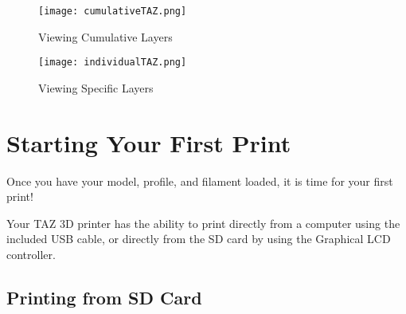 \begin{figure}[H]
\centering
\texttt{[image: cumulativeTAZ.png]}
\caption{Viewing Cumulative Layers}
\label{fig:Mid Layers View}
\end{figure}

\begin{figure}[H]
\centering
\texttt{[image: individualTAZ.png]}
\caption{Viewing Specific Layers}
\label{fig:Viewing Specific Layer}
\end{figure}

\section{Starting Your First Print}
Once you have your model, profile, and filament loaded, it is time for your first print! 






Your TAZ 3D printer has the ability to print directly from a computer using the included USB cable, or directly from the SD card by using the Graphical LCD controller.

\subsection{Printing from SD Card}

